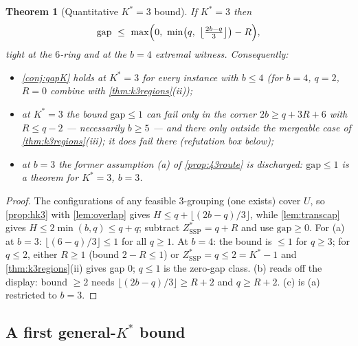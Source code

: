 \documentclass[11pt,a4paper]{article}
\theoremstyle{plain}
\newtheorem{theorem}{Theorem}[section]
\theoremstyle{definition}
\newcommand{\Kstar}{K^{*}}
\newcommand{\ZSSP}{Z_{\mathrm{SSP}}^{*}}
\begin{document}
\begin{thmbox}
\begin{theorem}[Quantitative $\Kstar=3$ bound]
\label{thm:k3count}
If $\Kstar=3$ then
\[
  \mathrm{gap}\ \le\ \max\Bigl(0,\ \min\bigl(q,\
  \bigl\lfloor\tfrac{2b-q}{3}\bigr\rfloor\bigr)-R\Bigr),
\]
tight at the $6$-ring and at the $b=4$ extremal witness. Consequently:
\begin{itemize}
\item[(a)] \cref{conj:gapK} holds at $\Kstar=3$ for \emph{every} instance with
$b\le4$ (for $b=4$, $q=2$, $R=0$ combine with \cref{thm:k3regions}(ii));
\item[(b)] at $\Kstar=3$ the bound $\mathrm{gap}\le1$ can fail only in the
corner $2b\ge q+3R+6$ with $R\le q-2$ --- necessarily $b\ge5$ --- and there
only outside the mergeable case of \cref{thm:k3regions}(iii); it \emph{does}
fail there (refutation box below);
\item[(c)] at $b=3$ the former assumption (a) of \cref{prop:43route} is
discharged: $\mathrm{gap}\le1$ is a theorem for $\Kstar=3$, $b=3$.
\end{itemize}
\end{theorem}
\end{thmbox}
\begin{proofbox}
\begin{proof}
The configurations of any feasible $3$-grouping (one exists) cover $U$, so
\cref{prop:hk3} with \cref{lem:overlap} gives
$H\le q+\lfloor(2b-q)/3\rfloor$, while \cref{lem:transcap} gives $H\le2\min(b,q)
\le q+q$; subtract $\ZSSP=q+R$ and use $\mathrm{gap}\ge0$. For (a) at $b=3$:
$\lfloor(6-q)/3\rfloor\le1$ for all $q\ge1$. At $b=4$: the bound is $\le1$ for
$q\ge3$; for $q\le2$, either $R\ge1$ (bound $2-R\le1$) or $\ZSSP=q\le2=\Kstar-1$
and \cref{thm:k3regions}(ii) gives gap $0$; $q\le1$ is the zero-gap class. (b)
reads off the display: bound $\ge2$ needs $\lfloor(2b-q)/3\rfloor\ge R+2$ and
$q\ge R+2$. (c) is (a) restricted to $b=3$.
\end{proof}
\end{proofbox}

\subsection{A first general-$\Kstar$ bound}
\label{ssec:genk}

\end{document}
